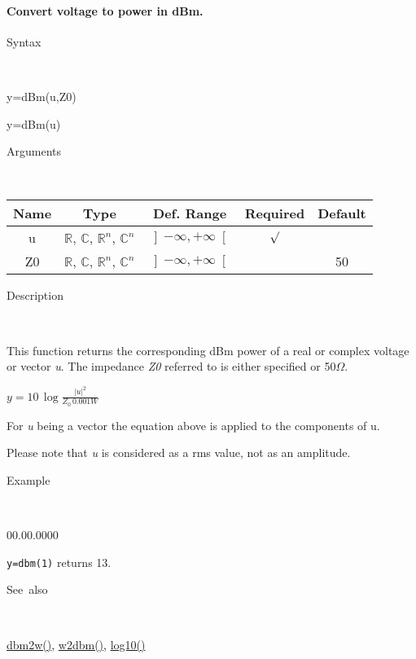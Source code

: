 \paragraph{\label{par:dbm}Convert voltage to power in dBm.}

\begin{description}
\item [Syntax]~
\end{description}
y=dBm(u,Z0)

\noindent y=dBm(u)

\begin{description}
\item [Arguments]~
\end{description}
\begin{tabular}{|c|c|c|c|c|}
\hline 
Name&
Type&
Def. Range&
Required&
Default\tabularnewline
\hline
\hline 
u&
$\mathbb{R}$, $\mathbb{C}$, $\mathbb{R}^{n}$, $\mathbb{C}^{n}$&
$\left]-\infty,+\infty\right[$&
$\surd$&
\tabularnewline
\hline 
Z0&
$\mathbb{R}$, $\mathbb{C}$, $\mathbb{R}^{n}$, $\mathbb{C}^{n}$&
$\left]-\infty,+\infty\right[$&
&
50\tabularnewline
\hline
\end{tabular}

\begin{description}
\item [Description]~
\end{description}
This function returns the corresponding dBm power of a real or complex
voltage or vector \textit{u}. The impedance \textit{Z0} referred to
is either specified or 50$\Omega$.

\medskip{}
$y=10\,\log{\displaystyle \frac{\left|u\right|^{2}}{Z_{0}\,0.001W}}$
\medskip{}

\noindent For \textit{u} being a vector the equation above is applied
to the components of u.

\noindent Please note that \textit{u} is considered as a rms value,
not as an amplitude.

\begin{description}
\item [Example]~
\end{description}
\begin{lyxlist}{00.00.0000}
\item [\texttt{y=dbm(1)}]returns 13.
\end{lyxlist}
\begin{description}
\item [See~also]~
\end{description}
\textcolor{blue}{\hyperlink{dbm2w}{dbm2w()}}\textcolor{black}{,}
\textcolor{blue}{\hyperlink{w2dbm}{w2dbm()}}\textcolor{black}{,}
\textcolor{blue}{\hyperlink{log10}{log10()}}


